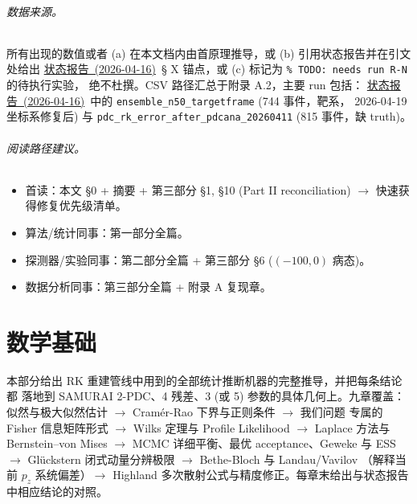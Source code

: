 \documentclass[a4paper, 11pt]{article}
\theoremstyle{plain}
\theoremstyle{definition}
\theoremstyle{remark}
\providecommand{\StatusReport}{\href{rk_reconstruction_status_20260416_zh.pdf}{状态报告~(2026-04-16)}}
\begin{document}
\paragraph{数据来源。}
所有出现的数值或者
(a) 在本文档内由首原理推导，或
(b) 引用状态报告并在引文处给出 \StatusReport\ § X 锚点，或
(c) 标记为 \texttt{\% TODO: needs run R-N} 的待执行实验，
绝不杜撰。CSV 路径汇总于附录 A.2，主要 run 包括：
\StatusReport\ 中的 \texttt{ensemble\_n50\_targetframe} (744 事件，靶系，
2026-04-19 坐标系修复后) 与 \texttt{pdc\_rk\_error\_after\_pdcana\_20260411}
(815 事件，缺 truth)。

\paragraph{阅读路径建议。}
\begin{itemize}[nosep]
  \item 首读：本文 §0 + 摘要 + 第三部分 §1, §10 (Part II reconciliation)
        \(\to\) 快速获得修复优先级清单。
  \item 算法/统计同事：第一部分全篇。
  \item 探测器/实验同事：第二部分全篇 + 第三部分 §6 ($(-100,0)$ 病态)。
  \item 数据分析同事：第三部分全篇 + 附录 A 复现章。
\end{itemize}

\newpage

\part{数学基础}\label{part:math}\label{sec:partIa}

本部分给出 RK 重建管线中用到的全部统计推断机器的完整推导，并把每条结论都
落地到 SAMURAI 2-PDC、4 残差、3 (或 5) 参数的具体几何上。九章覆盖：
似然与极大似然估计 \(\to\) Cramér-Rao 下界与正则条件 \(\to\) 我们问题
专属的 Fisher 信息矩阵形式 \(\to\) Wilks 定理与 Profile Likelihood
\(\to\) Laplace 方法与 Bernstein–von Mises \(\to\) MCMC 详细平衡、最优
acceptance、Geweke 与 ESS \(\to\) Glückstern 闭式动量分辨极限 \(\to\)
Bethe-Bloch 与 Landau/Vavilov （解释当前 $p_z$ 系统偏差）\(\to\) Highland
多次散射公式与精度修正。每章末给出与状态报告中相应结论的对照。




\end{document}
